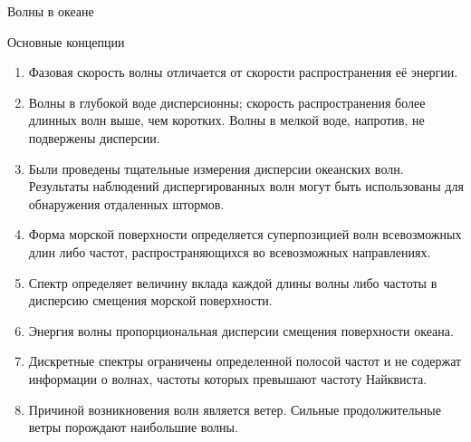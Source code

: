 \begin{chapter}{Волны в океане}
\begin{section}{Основные концепции}
\begin{enumerate}
\item 
Фазовая скорость волны отличается от скорости распространения её энергии.
%

\item 
Волны в глубокой воде дисперсионны; скорость распространения более длинных
волн выше, чем коротких. Волны в мелкой воде, напротив, не подвержены
дисперсии.
%

\item 
Были проведены тщательные измерения дисперсии океанских волн. Результаты
наблюдений диспергированных волн могут быть использованы для обнаружения 
отдаленных штормов.
%

\item 
Форма морской поверхности определяется суперпозицией волн всевозможных
длин либо частот, распространяющихся во всевозможных направлениях.
%

\item 
Спектр определяет величину вклада каждой длины волны либо частоты
в дисперсию смещения морской поверхности.
%

\item 
Энергия волны пропорциональная дисперсии смещения поверхности океана.
%

\item 
Дискретные спектры ограничены определенной полосой частот и не содержат
информации о волнах, частоты которых превышают частоту Найквиста.
%

\item 
Причиной возникновения волн является ветер. Сильные продолжительные ветры
порождают наибольшие волны.
%


\end{enumerate}
\end{section}
\end{chapter}
